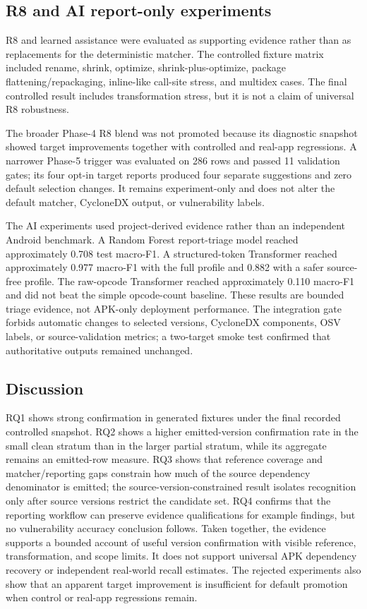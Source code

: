 \documentclass[10pt,twocolumn]{article}
\begin{document}
\subsection{R8 and AI report-only experiments}
R8 and learned assistance were evaluated as supporting evidence rather than as replacements for the deterministic matcher. The controlled fixture matrix included rename, shrink, optimize, shrink-plus-optimize, package flattening/repackaging, inline-like call-site stress, and multidex cases. The final controlled result includes transformation stress, but it is not a claim of universal R8 robustness.

The broader Phase-4 R8 blend was not promoted because its diagnostic snapshot showed target improvements together with controlled and real-app regressions. A narrower Phase-5 trigger was evaluated on 286 rows and passed 11 validation gates; its four opt-in target reports produced four separate suggestions and zero default selection changes. It remains experiment-only and does not alter the default matcher, CycloneDX output, or vulnerability labels.

The AI experiments used project-derived evidence rather than an independent Android benchmark. A Random Forest report-triage model reached approximately 0.708 test macro-F1. A structured-token Transformer reached approximately 0.977 macro-F1 with the full profile and 0.882 with a safer source-free profile. The raw-opcode Transformer reached approximately 0.110 macro-F1 and did not beat the simple opcode-count baseline. These results are bounded triage evidence, not APK-only deployment performance. The integration gate forbids automatic changes to selected versions, CycloneDX components, OSV labels, or source-validation metrics; a two-target smoke test confirmed that authoritative outputs remained unchanged.
\subsection{Discussion}
RQ1 shows strong confirmation in generated fixtures under the final recorded controlled snapshot. RQ2 shows a higher emitted-version confirmation rate in the small clean stratum than in the larger partial stratum, while its aggregate remains an emitted-row measure. RQ3 shows that reference coverage and matcher/reporting gaps constrain how much of the source dependency denominator is emitted; the source-version-constrained result isolates recognition only after source versions restrict the candidate set. RQ4 confirms that the reporting workflow can preserve evidence qualifications for example findings, but no vulnerability accuracy conclusion follows.
Taken together, the evidence supports a bounded account of useful version confirmation with visible reference, transformation, and scope limits. It does not support universal APK dependency recovery or independent real-world recall estimates. The rejected experiments also show that an apparent target improvement is insufficient for default promotion when control or real-app regressions remain.
\end{document}
